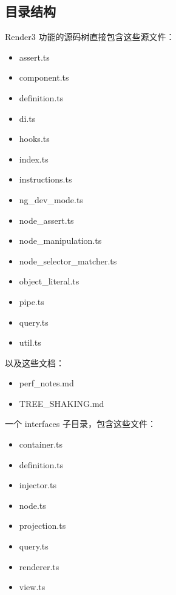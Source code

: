 \subsection{目录结构}


Render3 功能的源码树直接包含这些源文件：

\begin{itemize}
  \item assert.ts
  \item component.ts
  \item definition.ts
  \item di.ts
  \item hooks.ts
  \item index.ts
  \item instructions.ts
  \item ng\_dev\_mode.ts
  \item node\_assert.ts
  \item node\_manipulation.ts
  \item node\_selector\_matcher.ts
  \item object\_literal.ts
  \item pipe.ts
  \item query.ts
  \item util.ts
\end{itemize}


以及这些文档：

\begin{itemize}
  \item perf\_notes.md
  \item TREE\_SHAKING.md
\end{itemize}


一个 interfaces 子目录，包含这些文件：

\begin{itemize}
  \item container.ts
  \item definition.ts
  \item injector.ts
  \item node.ts
  \item projection.ts
  \item query.ts
  \item renderer.ts
  \item view.ts
\end{itemize}


